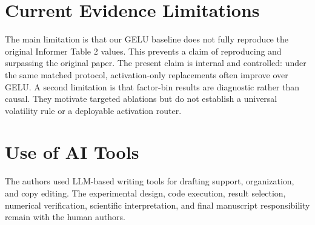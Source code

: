 \section{Current Evidence Limitations}

The main limitation is that our GELU baseline does not fully reproduce the original Informer Table 2 values. This prevents a claim of reproducing and surpassing the original paper. The present claim is internal and controlled: under the same matched protocol, activation-only replacements often improve over GELU. A second limitation is that factor-bin results are diagnostic rather than causal. They motivate targeted ablations but do not establish a universal volatility rule or a deployable activation router.

\section{Use of AI Tools}

The authors used LLM-based writing tools for drafting support, organization, and copy editing. The experimental design, code execution, result selection, numerical verification, scientific interpretation, and final manuscript responsibility remain with the human authors.
